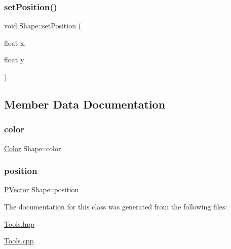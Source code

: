\subsubsection{\texorpdfstring{set\+Position()}{setPosition()}\hspace{0.1cm}{\footnotesize\ttfamily [2/2]}}
{\footnotesize\ttfamily void Shape\+::set\+Position (\begin{DoxyParamCaption}\item[{float}]{x,  }\item[{float}]{y }\end{DoxyParamCaption})}



\subsection{Member Data Documentation}
\hypertarget{class_shape_ac56e2bf5eb24cf37b6e08c671501566b}{}\label{class_shape_ac56e2bf5eb24cf37b6e08c671501566b} 
\subsubsection{\texorpdfstring{color}{color}}
{\footnotesize\ttfamily \hyperlink{struct_color}{Color} Shape\+::color\hspace{0.3cm}{\ttfamily [protected]}}

\hypertarget{class_shape_afb4e17803a82f3144777cd249480cb91}{}\label{class_shape_afb4e17803a82f3144777cd249480cb91} 
\subsubsection{\texorpdfstring{position}{position}}
{\footnotesize\ttfamily \hyperlink{struct_p_vector}{P\+Vector} Shape\+::position\hspace{0.3cm}{\ttfamily [protected]}}



The documentation for this class was generated from the following files\+:\begin{DoxyCompactItemize}
\item 
\hyperlink{_tools_8hpp}{Tools.\+hpp}\item 
\hyperlink{_tools_8cpp}{Tools.\+cpp}\end{DoxyCompactItemize}
